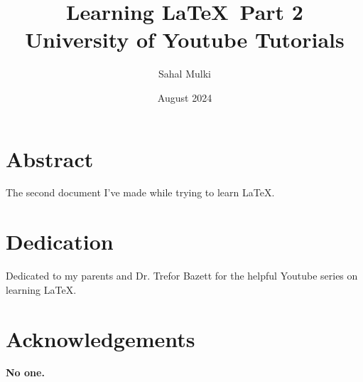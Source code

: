 \documentclass{report}
\title{Learning \LaTeX \ Part 2\\
{\Large University of Youtube Tutorials}}
\author{Sahal Mulki}
\date{August 2024}
\begin{document}
\maketitle

\chapter*{Abstract}

The second document I've made while trying to learn \LaTeX.

\chapter*{Dedication}

Dedicated to my parents and Dr. Trefor Bazett for the helpful Youtube series on learning \LaTeX.

\chapter*{Acknowledgements}

\textbf{No one.}
\end{document}
